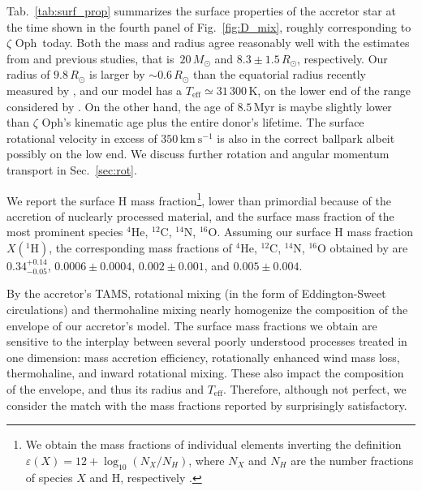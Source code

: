 \documentclass[twocolumn,twocolappendix,trackchanges]{aastex63}
\newcommand{\kms}{{\mathrm{km\ s^{-1}}}}
\DeclareRobustCommand{\Figref}[1]{Fig.~\ref{#1}}
\DeclareRobustCommand{\Tabref}[1]{Tab.~\ref{#1}}
\DeclareRobustCommand{\Secref}[1]{Sec.~\ref{#1}}
\newcommand{\zoph}{$\zeta$ Oph}
\begin{document}
\Tabref{tab:surf_prop} summarizes the surface properties of the
accretor star at the time shown in the fourth panel of
\Figref{fig:D_mix}, roughly corresponding to \zoph\ today. Both the
mass and radius agree reasonably well with the estimates from
 and previous studies, that is~$20\,M_\odot$
and $8.3\pm1.5\,R_\odot$, respectively. Our radius of $9.8\,R_\odot$
is larger by $\sim0.6\,R_\odot$ than the equatorial radius recently
measured by \cite{gordon:18}, and our model has a
$T_\mathrm{eff}\simeq31\,300$\,K, on the lower end of the range considered by
. On the other hand, the age of
$8.5$\,Myr is maybe slightly lower than \zoph's
kinematic age plus the entire donor's lifetime. The surface rotational velocity in excess
of $350\,\kms$ is also in the correct ballpark albeit possibly on the
low end. We discuss further rotation and angular momentum transport in
\Secref{sec:rot}.

We report the surface H mass fraction\footnote{We obtain the mass
  fractions of individual elements inverting the definition
  $\varepsilon(X)=12+\log_{10}(N_X/N_H)$, where $N_X$ and $N_H$ are
  the number fractions of species $X$ and H, respectively
  \citep[e.g.,][]{lodders:19}.}, lower than primordial because of the
accretion of nuclearly processed material, and the surface mass
fraction of the most prominent species $^4\mathrm{He}$,
$^{12}\mathrm{C}$, $^{14}\mathrm{N}$, $^{16}\mathrm{O}$.  Assuming our
surface H mass fraction $X(^1\mathrm{H})$, the corresponding mass
fractions of $^4\mathrm{He}$, $^{12}\mathrm{C}$, $^{14}\mathrm{N}$,
$^{16}\mathrm{O}$ obtained by  are
$0.34^{+0.14}_{-0.05}$, $0.0006\pm0.0004$, $0.002\pm0.001$, and
$0.005\pm0.004$.

By the accretor's TAMS, rotational mixing (in the
form of Eddington-Sweet circulations) and thermohaline mixing nearly
homogenize the composition of the envelope of our accretor's
model. The surface mass fractions we obtain are sensitive to the
interplay between several poorly understood processes treated in one
dimension: mass accretion efficiency, rotationally enhanced wind mass
loss, thermohaline, and inward rotational mixing. These also impact
the composition of the envelope, and thus its radius and
$T_\mathrm{eff}$. Therefore, although not perfect, we consider the
match with the mass fractions reported by 
surprisingly satisfactory.
\end{document}

